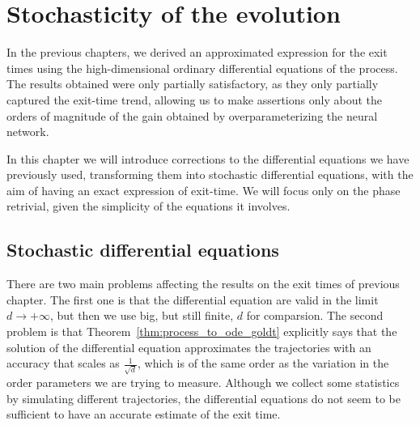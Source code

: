 \chapter{Stochasticity of the evolution}
In the previous chapters, we derived an approximated expression for the exit times using the high-dimensional
ordinary differential equations of the process.
The results obtained were only partially satisfactory, as they only partially captured the exit-time trend,
allowing us to make assertions only about the orders of magnitude of the gain obtained by overparameterizing the neural network.

In this chapter we will introduce corrections to the differential equations we have previously used,
transforming them into stochastic differential equations, with the aim of having an exact expression of exit-time.
We will focus only on the phase retrivial, given the simplicity of the equations it involves. 

\section{Stochastic differential equations}
There are two main problems affecting the results on the exit times of previous chapter.
The first one is that the differential equation are valid in the limit~\(d\to+\infty\),
but then we use big, but still finite, \(d\) for comparsion. 
The second problem is that Theorem~\ref{thm:process_to_ode_goldt} explicitly says that the solution of the differential equation approximates the trajectories with an accuracy that scales as \(\frac{1}{\sqrt{d}}\),
which is of the same order as the variation in the order parameters we are trying to measure.
Although we collect some statistics by simulating different trajectories,
the differential equations do not seem to be sufficient to have an accurate estimate of the exit time.

